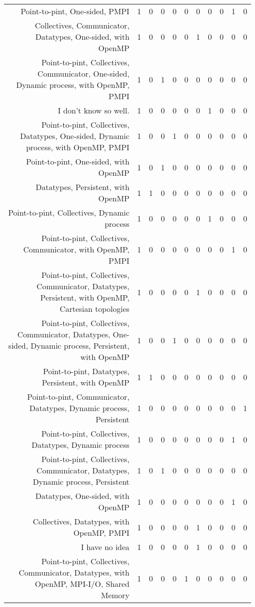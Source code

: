 {\begin{landscape}
\begin{longtable}[htb]{r|c|c|c|c|c|c|c|c|c|c}
{Point-to-pint, One-sided, PMPI} & 1 & 0 & 0 & 0 & 0 & 0 & 0 & 0 & 1 & 0 \\%
{Collectives, Communicator, Datatypes, One-sided, with OpenMP} & 1 & 0 & 0 & 0 & 0 & 1 & 0 & 0 & 0 & 0 \\%
{Point-to-pint, Collectives, Communicator, One-sided, Dynamic process, with OpenMP, PMPI} & 1 & 0 & 1 & 0 & 0 & 0 & 0 & 0 & 0 & 0 \\%
{I don't know so well.} & 1 & 0 & 0 & 0 & 0 & 0 & 1 & 0 & 0 & 0 \\%
{Point-to-pint, Collectives, Datatypes, One-sided, Dynamic process, with OpenMP, PMPI} & 1 & 0 & 0 & 1 & 0 & 0 & 0 & 0 & 0 & 0 \\%
{Point-to-pint, One-sided, with OpenMP} & 1 & 0 & 1 & 0 & 0 & 0 & 0 & 0 & 0 & 0 \\%
{Datatypes, Persistent, with OpenMP} & 1 & 1 & 0 & 0 & 0 & 0 & 0 & 0 & 0 & 0 \\%
{Point-to-pint, Collectives, Dynamic process} & 1 & 0 & 0 & 0 & 0 & 0 & 1 & 0 & 0 & 0 \\%
{Point-to-pint, Collectives, Communicator, with OpenMP, PMPI} & 1 & 0 & 0 & 0 & 0 & 0 & 0 & 0 & 1 & 0 \\%
{Point-to-pint, Collectives, Communicator, Datatypes, Persistent, with OpenMP, Cartesian topologies} & 1 & 0 & 0 & 0 & 0 & 1 & 0 & 0 & 0 & 0 \\%
{Point-to-pint, Collectives, Communicator, Datatypes, One-sided, Dynamic process, Persistent, with OpenMP} & 1 & 0 & 0 & 1 & 0 & 0 & 0 & 0 & 0 & 0 \\%
{Point-to-pint, Datatypes, Persistent, with OpenMP} & 1 & 1 & 0 & 0 & 0 & 0 & 0 & 0 & 0 & 0 \\%
{Point-to-pint, Communicator, Datatypes, Dynamic process, Persistent} & 1 & 0 & 0 & 0 & 0 & 0 & 0 & 0 & 0 & 1 \\%
{Point-to-pint, Collectives, Datatypes, Dynamic process} & 1 & 0 & 0 & 0 & 0 & 0 & 0 & 0 & 1 & 0 \\%
{Point-to-pint, Collectives, Communicator, Datatypes, Dynamic process, Persistent} & 1 & 0 & 1 & 0 & 0 & 0 & 0 & 0 & 0 & 0 \\%
{Datatypes, One-sided, with OpenMP} & 1 & 0 & 0 & 0 & 0 & 0 & 0 & 0 & 1 & 0 \\%
{Collectives, Datatypes, with OpenMP, PMPI} & 1 & 0 & 0 & 0 & 0 & 1 & 0 & 0 & 0 & 0 \\%
{I have no idea} & 1 & 0 & 0 & 0 & 0 & 1 & 0 & 0 & 0 & 0 \\%
{Point-to-pint, Collectives, Communicator, Datatypes, with OpenMP, MPI-I/O, Shared Memory} & 1 & 0 & 0 & 0 & 1 & 0 & 0 & 0 & 0 & 0 \\%

\end{longtable}
\end{landscape}}
